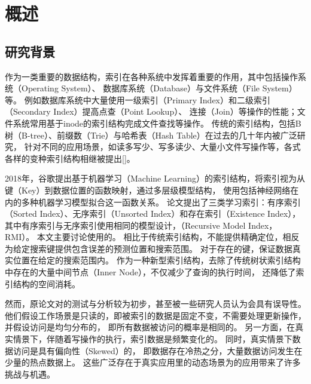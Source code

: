 
\chapter{概述}
\label{chap:intro}

\section{研究背景}

作为一类重要的数据结构，索引在各种系统中发挥着重要的作用，其中包括操作系统（Operating System）、
数据库系统（Database）与文件系统（File System）等。
例如数据库系统中大量使用一级索引（Primary Index）和二级索引（Secondary Index）提高点查（Point Lookup）、
连接（Join）等操作的性能；文件系统常用基于inode的索引结构完成文件查找等操作。
传统的索引结构，包括B树（B-tree）、前缀数（Trie）与哈希表（Hash Table）在过去的几〸年内被广泛研究，
针对不同的应用场景，如读多写少、写多读少、大量小文件写操作等，各式各样的变种索引结构相继被提出[]。

2018年，谷歌提出基于机器学习（Machine Learning）的索引结构\cite{kraska2018case}，将索引视为从键（Key）到数据位置的函数映射，通过多层级模型结构，
使用包括神经网络在内的多种机器学习模型拟合这一函数关系。
论文提出了三类学习索引：有序索引（Sorted Index）、无序索引（Unsorted Index）和存在索引（Existence Index），
其中有序索引与无序索引使用相同的模型设计，{\rmi}（Recursive Model Index，RMI）。
本文主要讨论使用{\rmi}的{\li}。
相比于传统索引结构，{\li}不能提供精确定位，相反{\li}为给定搜索键提供包含误差的预测位置和搜索范围。
对于存在的键，{\li}保证数据真实位置在给定的搜索范围内。
作为一种新型索引结构，{\li}去除了传统树状索引结构中存在的大量中间节点（Inner Node），不仅减少了查询的执行时间，
还降低了索引结构的空间消耗。

然而，原论文\cite{kraska2018case}对{\li}的测试与分析较为初步，甚至被一些研究人员认为会具有误导性\cite{throwalgo}。
他们假设工作场景是只读的，即被索引的数据是固定不变，{\li}不需要处理更新操作，并假设访问是均匀分布的，
即所有数据被访问的概率是相同的。
另一方面，在真实情景下，伴随着写操作的执行，索引数据是频繁变化的\cite{tpcc}。
同时，真实情景下数据访问是具有偏向性（Skewed）的\cite{zhang2016reducing, debrabant2013anti, eldawy2014trekking, levandoski2013identifying}，
即数据存在冷热之分，大量数据访问发生在少量的热点数据上。
这些广泛存在于真实应用里的动态场景为{\li}的应用带来了许多挑战与机遇。

